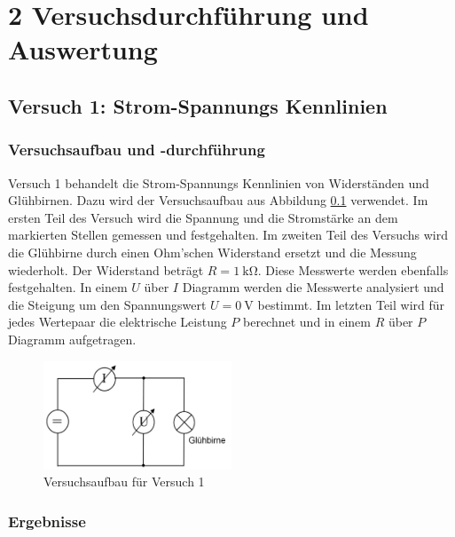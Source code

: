 \chapter*{2 Versuchsdurchführung und Auswertung}
\setcounter{chapter}{2}
\setcounter{section}{0}
\setcounter{subsection}{0}

\section{Versuch 1: Strom-Spannungs Kennlinien}

    \subsection{Versuchsaufbau und -durchführung}

        Versuch 1 behandelt die Strom-Spannungs Kennlinien von Widerständen und Glühbirnen. Dazu wird der Versuchsaufbau aus Abbildung \ref{fig:versuch1} verwendet. Im ersten Teil des Versuch wird die Spannung und die Stromstärke an dem markierten Stellen gemessen und festgehalten. Im zweiten Teil des Versuchs wird die Glühbirne durch einen Ohm'schen Widerstand ersetzt und die Messung wiederholt. Der Widerstand beträgt $R = 1\ \mathrm{k\Omega}$. Diese Messwerte werden ebenfalls festgehalten. In einem $U$ über $I$ Diagramm werden die Messwerte analysiert und die Steigung um den Spannungswert $U = 0\ \mathrm{V}$ bestimmt.
        Im letzten Teil wird für jedes Wertepaar die elektrische Leistung $P$ berechnet und in einem $R$ über $P$ Diagramm aufgetragen.

        \begin{figure}[h!]
            \centering
            \includegraphics[width=0.5\textwidth]{bilder/Physik_01.png}
            \caption{Versuchsaufbau für Versuch 1}
            \label{fig:versuch1}
        \end{figure}

    \subsection{Ergebnisse}

